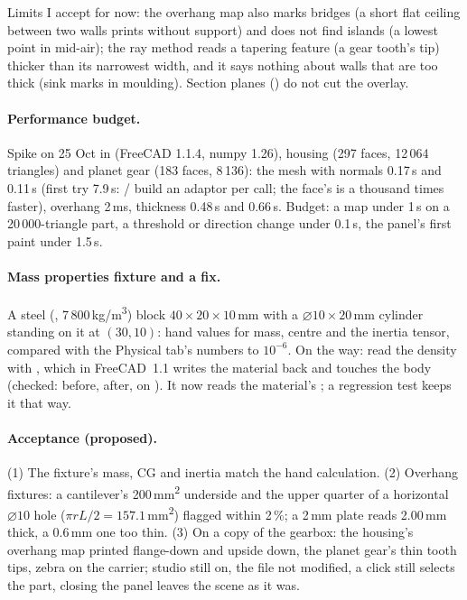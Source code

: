 Limits I accept for now: the overhang map also marks bridges (a short flat ceiling between two walls prints without
support) and does not find islands (a lowest point in mid-air); the ray method reads a tapering feature (a gear
tooth's tip) thicker than its narrowest width, and it says nothing about walls that are too thick (sink marks in
moulding). Section planes () do not cut the overlay.

\paragraph{Performance budget.} Spike on 25 Oct in  (FreeCAD 1.1.4, numpy 1.26), housing
 (297 faces, 12\,064 triangles) and planet gear  (183 faces, 8\,136):
the mesh with normals 0.17\,s and 0.11\,s (first try 7.9\,s: / build an adaptor
per call; the face's  is a thousand times faster), overhang 2\,ms, thickness 0.48\,s and 0.66\,s.
Budget: a map under 1\,s on a 20\,000-triangle part, a threshold or direction change under 0.1\,s, the panel's first
paint under 1.5\,s.

\paragraph{Mass properties fixture and a fix.} A steel (, 7\,800\,kg/m\textsuperscript{3}) block
$40\times20\times10$\,mm with a $\varnothing10\times20$\,mm cylinder standing on it at $(30,10)$: hand values for
mass, centre and the inertia tensor, compared with the Physical tab's numbers to $10^{-6}$. On the way:
 read the density with , which in FreeCAD~1.1 writes the material
back and touches the body (checked:  before,  after, on ). It now
reads the material's ; a regression test keeps it that way.

\paragraph{Acceptance (proposed).} (1) The fixture's mass, CG and inertia match the hand calculation. (2) Overhang
fixtures: a cantilever's 200\,mm\textsuperscript{2} underside and the upper quarter of a horizontal $\varnothing10$
hole ($\pi r L/2=157.1$\,mm\textsuperscript{2}) flagged within 2\,\%; a 2\,mm plate reads 2.00\,mm thick, a
0.6\,mm one too thin. (3) On a copy of the gearbox: the housing's overhang map printed flange-down and upside down,
the planet gear's thin tooth tips, zebra on the carrier; studio still on, the file not modified, a click still
selects the part, closing the panel leaves the scene as it was.

